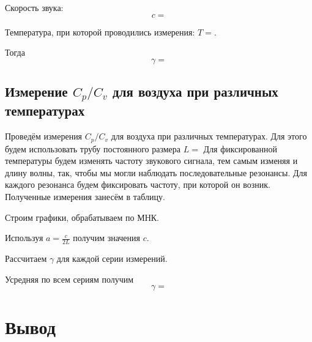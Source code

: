 \documentclass[12pt,a4paper]{article}
\begin{document}
		Скорость звука:
			$$c = $$
		
		Температура, при которой проводились измерения: $T = $.
		
		Тогда
			$$\gamma = $$
		
		\subsection*{Измерение $C_p/C_v$ для воздуха при различных температурах}
		
		Проведём измерения $C_p/C_v$ для воздуха при различных температурах.
		Для этого будем использовать трубу постоянного размера $L = $
		Для фиксированной температуры будем изменять частоту звукового сигнала, тем самым изменяя и длину волны, так, чтобы мы могли наблюдать последовательные резонансы.
		Для каждого резонанса будем фиксировать частоту, при которой он возник.
		Полученные измерения занесём в таблицу.
		
		
		Строим графики, обрабатываем по МНК.
		
		
		
		Используя $a = \frac{c}{2L}$ получим значения $c$.
		
		Рассчитаем $\gamma$ для каждой серии измерений.
		
		Усредняя по всем сериям получим
			$$\gamma = $$
		
	\section*{Вывод}
	
\end{document}
